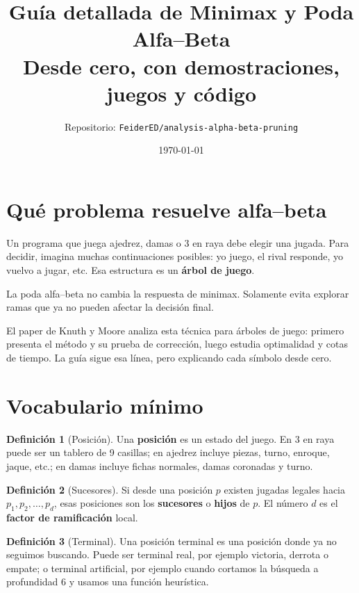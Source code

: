 \documentclass[11pt,a4paper]{article}
\title{Guía detallada de Minimax y Poda Alfa--Beta\\\large Desde cero, con demostraciones, juegos y código}
\author{Repositorio: \texttt{FeiderED/analysis-alpha-beta-pruning}}
\date{\today}
\theoremstyle{definition}
\newtheorem{definition}{Definición}[section]
\begin{document}
\maketitle
\tableofcontents
\newpage

\section{Qué problema resuelve alfa--beta}

Un programa que juega ajedrez, damas o 3 en raya debe elegir una jugada. Para decidir, imagina muchas continuaciones posibles: yo juego, el rival responde, yo vuelvo a jugar, etc. Esa estructura es un \textbf{árbol de juego}.

\begin{idea}
La poda alfa--beta no cambia la respuesta de minimax. Solamente evita explorar ramas que ya no pueden afectar la decisión final.
\end{idea}

El paper de Knuth y Moore analiza esta técnica para árboles de juego: primero presenta el método y su prueba de corrección, luego estudia optimalidad y cotas de tiempo. La guía sigue esa línea, pero explicando cada símbolo desde cero.

\section{Vocabulario mínimo}

\begin{definition}[Posición]
Una \textbf{posición} es un estado del juego. En 3 en raya puede ser un tablero de 9 casillas; en ajedrez incluye piezas, turno, enroque, jaque, etc.; en damas incluye fichas normales, damas coronadas y turno.
\end{definition}

\begin{definition}[Sucesores]
Si desde una posición $p$ existen jugadas legales hacia $p_1,p_2,\ldots,p_d$, esas posiciones son los \textbf{sucesores} o \textbf{hijos} de $p$. El número $d$ es el \textbf{factor de ramificación} local.
\end{definition}

\begin{definition}[Terminal]
Una posición terminal es una posición donde ya no seguimos buscando. Puede ser terminal real, por ejemplo victoria, derrota o empate; o terminal artificial, por ejemplo cuando cortamos la búsqueda a profundidad 6 y usamos una función heurística.
\end{definition}
\end{document}
